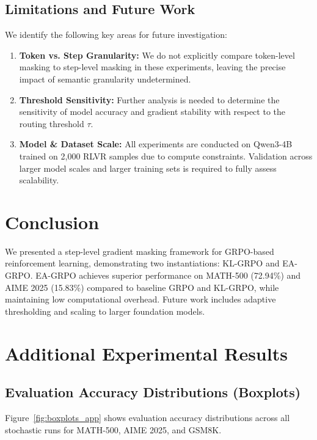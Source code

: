 \documentclass{article}
\begin{document}
\subsection{Limitations and Future Work}
\label{sec:limits}
We identify the following key areas for future investigation:
\begin{enumerate}
\item \textbf{Token vs. Step Granularity:} We do not explicitly compare token-level masking to step-level masking in these experiments, leaving the precise impact of semantic granularity undetermined.
\item \textbf{Threshold Sensitivity:} Further analysis is needed to determine the sensitivity of model accuracy and gradient stability with respect to the routing threshold $\tau$.
\item \textbf{Model \& Dataset Scale:} All experiments are conducted on Qwen3-4B trained on 2,000 RLVR samples due to compute constraints. Validation across larger model scales and larger training sets is required to fully assess scalability.
\end{enumerate}




\section{Conclusion}

We presented a step-level gradient masking framework for GRPO-based reinforcement learning, demonstrating two instantiations: KL-GRPO and EA-GRPO. EA-GRPO achieves superior performance on MATH-500 (72.94\%) and AIME 2025 (15.83\%) compared to baseline GRPO and KL-GRPO, while maintaining low computational overhead. Future work includes adaptive thresholding and scaling to larger foundation models.





\newpage
\appendix
\section{Additional Experimental Results}

\subsection{Evaluation Accuracy Distributions (Boxplots)}
Figure~\ref{fig:boxplots_app} shows evaluation accuracy distributions across all stochastic runs for MATH-500, AIME 2025, and GSM8K.
\end{document}
